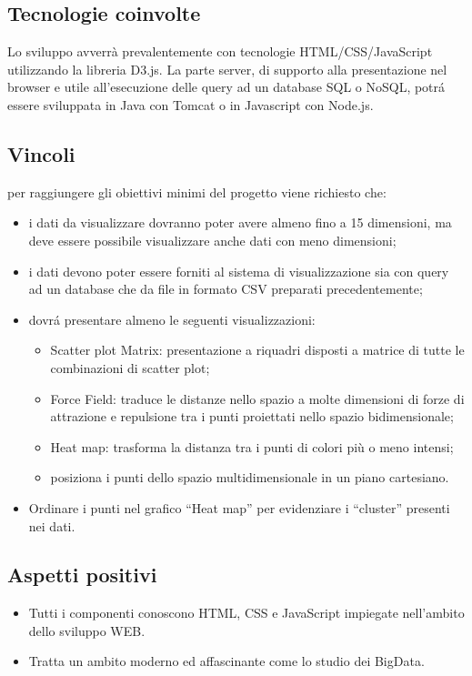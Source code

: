 \subsection{Tecnologie coinvolte}
Lo sviluppo avverrà prevalentemente con tecnologie HTML/CSS/JavaScript utilizzando la libreria D3.js.
La parte server, di supporto alla presentazione nel browser e utile all'esecuzione delle query ad un database SQL o NoSQL, potr\'a essere sviluppata in Java con Tomcat o in Javascript con Node.js.

\subsection{Vincoli}
per raggiungere gli obiettivi minimi del progetto viene richiesto che:
\begin{itemize}
	\item i dati da visualizzare dovranno poter avere almeno fino a 15 dimensioni, ma deve essere possibile visualizzare anche dati con meno dimensioni;
	\item i dati devono poter essere forniti al sistema di visualizzazione sia con query ad un database che da file in formato CSV preparati precedentemente;
	\item dovr\'a presentare almeno le seguenti visualizzazioni:
	\begin{itemize}
		\item Scatter plot Matrix: presentazione a riquadri disposti a matrice di tutte le combinazioni di scatter plot;
		\item Force Field: traduce le distanze nello spazio a molte dimensioni di forze di attrazione e repulsione tra i punti proiettati nello spazio bidimensionale;
		\item Heat map: trasforma la distanza tra i punti di colori più o meno intensi;
		\item posiziona i punti dello spazio multidimensionale in un piano
		cartesiano.
	\end{itemize}
	\item Ordinare i punti nel grafico “Heat map” per evidenziare i “cluster” presenti nei dati.
\end{itemize}

\subsection{Aspetti positivi}
\begin{itemize}
	\item Tutti i componenti conoscono HTML, CSS e JavaScript impiegate nell'ambito dello sviluppo WEB.
	\item Tratta un ambito moderno ed affascinante come lo studio dei BigData.
\end{itemize}

